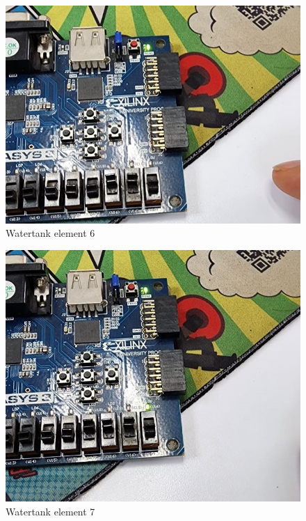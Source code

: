 \documentclass{article}
\begin{document}
\begin{multicols}{2}
	\begin{figure}[H]
		\centering
		\includegraphics[width=0.8\linewidth]{images/diagrams/watertank/watertank6.jpg}
		\caption{Watertank element 6}
		\label{Watertank element 6 Apendix}
	\end{figure}

	\begin{figure}[H]
		\centering
		\includegraphics[width=0.8\linewidth]{images/diagrams/watertank/watertank7.jpg}
		\caption{Watertank element 7}
		\label{Watertank element 7 Apendix}
	\end{figure}


\end{multicols}
\end{document}
